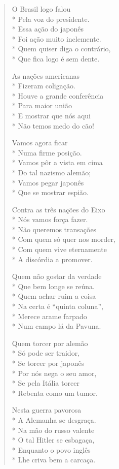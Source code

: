 \begin{verse}
O Brasil logo falou \\*
Pela voz do presidente.\\*
Essa ação do japonês\\*
Foi ação muito inclemente.\\*
Quem quiser diga o contrário,\\*
Que fica logo é sem dente.

As nações americanas\\*
Fizeram coligação.\\*
Houve a grande conferência\\*
Para maior união\\*
E mostrar que nós aqui\\*
Não temos medo do cão!

Vamos agora ficar\\*
Numa firme posição.\\*
Vamos pôr a vista em cima\\*
Do tal nazismo alemão;\\*
Vamos pegar japonês\\*
Que se mostrar espião.

Contra as três nações do Eixo\\*
Nós vamos força fazer.\\*
Não queremos transações\\*
Com quem só quer nos morder,\\*
Com quem vive eternamente\\*
A discórdia a promover.

Quem não gostar da verdade\\*
Que bem longe se reúna.\\*
Quem achar ruim a coisa\\*
Na certa é “quinta coluna”,\\*
Merece arame farpado\\*
Num campo lá da Pavuna.

Quem torcer por alemão\\*
Só pode ser traidor,\\*
Se torcer por japonês\\*
Por nós nega o seu amor,\\*
Se pela Itália torcer\\*
Rebenta como um tumor.

Nesta guerra pavorosa\\*
A Alemanha se desgraça.\\*
Na mão do russo valente\\*
O tal Hitler se esbagaça,\\*
Enquanto o povo inglês\\*
Lhe criva bem a carcaça.


\end{verse}
